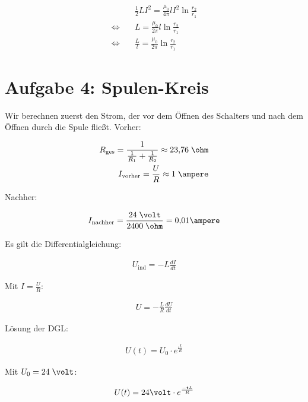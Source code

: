 \documentclass[a4paper,german,12pt,smallheadings]{scrartcl}
\begin{document}
\begin{align*}
  &\frac{1}{2}LI^2 = \frac{\mu_0}{4 \pi} l I^2  \ln \frac{r_2}{r_1} \\
  \Leftrightarrow\quad&L = \frac{\mu_0}{2 \pi} l  \ln \frac{r_2}{r_1} \\
  \Leftrightarrow\quad&\frac{L}{l} = \frac{\mu_0}{2 \pi} \ln \frac{r_2}{r_1}
\end{align*}

\section*{Aufgabe 4: Spulen-Kreis}

Wir berechnen zuerst den Strom, der vor dem Öffnen des Schalters und nach dem Öffnen durch die Spule fließt. Vorher:

\begin{align*}
  R_{\text{ges}} = \frac{1}{\frac{1}{R_1} + \frac{1}{R_2}} \approx 23{,}76\;\ohm \\
  I_{\text{vorher}} = \frac{U}{R} \approx 1 \;\ampere
\end{align*}

Nachher:

\begin{align*}
  I_{\text{nachher}} = \frac{24 \; \volt}{2400 \; \ohm} = 0{,}01 \ampere
\end{align*}

Es gilt die Differentialgleichung:

\begin{align*}
  U_{\text{ind}} = -L \frac{dI}{dt}
\end{align*}

Mit $I = \frac{U}{R}$:

\begin{align*}
  U = -\frac{L}{R} \frac{dU}{dt}
\end{align*}

Lösung der DGL:

\begin{align*}
  U(t) = U_0 \cdot e^\frac{_tL}{R}
\end{align*}

Mit $U_0 = 24 \;\volt$:

\begin{align*}
  U(t) = 24 \volt \cdot e^\frac{-tL}{R}
\end{align*}
\end{document}
